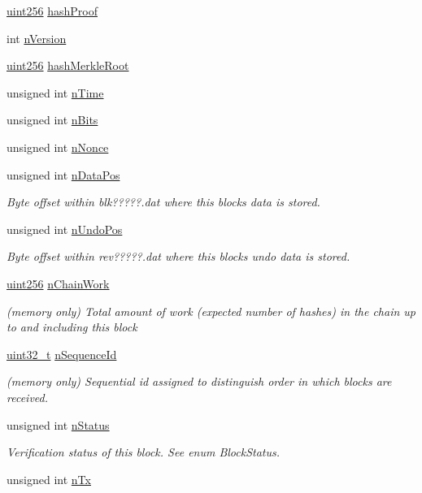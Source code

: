\begin{DoxyCompactItemize}
\hyperlink{classuint256}{uint256} \hyperlink{class_c_block_index_a553e6fc301e8130118d7ec68dce91ee9}{hash\+Proof}
\item 
int \hyperlink{class_c_block_index_a45126301a0a6e26010527a7bbfc1ef58}{n\+Version}
\item 
\hyperlink{classuint256}{uint256} \hyperlink{class_c_block_index_a0601b6b2bd6eaedfbc283c00d045a21c}{hash\+Merkle\+Root}
\item 
unsigned int \hyperlink{class_c_block_index_a4b687a226e9e166b0f91c1b616b543a6}{n\+Time}
\item 
unsigned int \hyperlink{class_c_block_index_a3324894e6af612d1bd76f89378435713}{n\+Bits}
\item 
unsigned int \hyperlink{class_c_block_index_a5e0a648ed1df8da171eba636d5ebef01}{n\+Nonce}
\item 
unsigned int \hyperlink{class_c_block_index_af164283dfb2d62ac44be8d10446bce4a}{n\+Data\+Pos}
\begin{DoxyCompactList}\small\item\em Byte offset within blk?????.dat where this block\textquotesingle{}s data is stored. \end{DoxyCompactList}\item 
unsigned int \hyperlink{class_c_block_index_a865ddd56406c23e98cdc61511a61eb64}{n\+Undo\+Pos}
\begin{DoxyCompactList}\small\item\em Byte offset within rev?????.dat where this block\textquotesingle{}s undo data is stored. \end{DoxyCompactList}\item 
\hyperlink{classuint256}{uint256} \hyperlink{class_c_block_index_a8451dbcf199348b9efe4ee3625e9b0f0}{n\+Chain\+Work}
\begin{DoxyCompactList}\small\item\em (memory only) Total amount of work (expected number of hashes) in the chain up to and including this block \end{DoxyCompactList}\item 
\hyperlink{stdint_8h_a435d1572bf3f880d55459d9805097f62}{uint32\+\_\+t} \hyperlink{class_c_block_index_a4a679af5f7924cc594b8131371b21e54}{n\+Sequence\+Id}
\begin{DoxyCompactList}\small\item\em (memory only) Sequential id assigned to distinguish order in which blocks are received. \end{DoxyCompactList}\item 
unsigned int \hyperlink{class_c_block_index_ac5a336b45ca70e3ed2fc090bf2ee3011}{n\+Status}
\begin{DoxyCompactList}\small\item\em Verification status of this block. See enum Block\+Status. \end{DoxyCompactList}\item 
unsigned int \hyperlink{class_c_block_index_ac8e219a377839d2f9133a4387f46e44e}{n\+Tx}
\end{DoxyCompactItemize}


